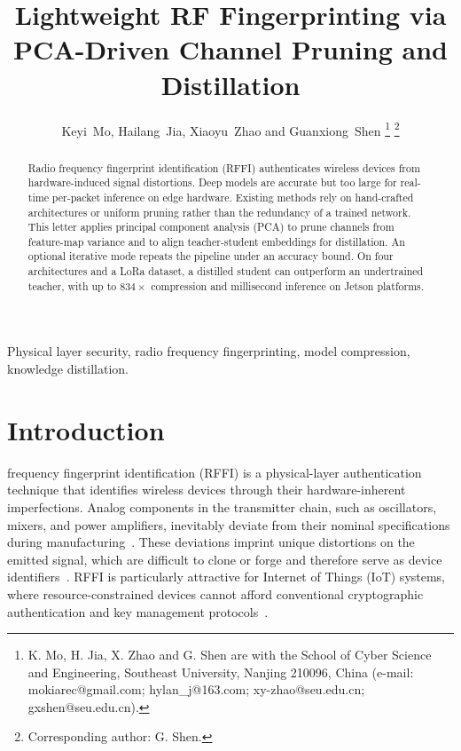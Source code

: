 \documentclass[journal,comsoc]{IEEEtran}
\begin{document}
\title{Lightweight RF Fingerprinting via PCA-Driven Channel Pruning and Distillation}

\author{Keyi~Mo, Hailang~Jia, Xiaoyu~Zhao and Guanxiong~Shen%
\thanks{K. Mo, H. Jia, X. Zhao and G. Shen are with the School of Cyber Science and Engineering, Southeast University, Nanjing 210096, China (e-mail: mokiarec@gmail.com; hylan\_j@163.com; xy-zhao@seu.edu.cn; gxshen@seu.edu.cn).}%
\thanks{Corresponding author: G. Shen.}%
}

\maketitle


\begin{abstract}
Radio frequency fingerprint identification (RFFI) authenticates wireless devices from hardware-induced signal distortions.
Deep models are accurate but too large for real-time per-packet inference on edge hardware.
Existing methods rely on hand-crafted architectures or uniform pruning rather than the redundancy of a trained network.
This letter applies principal component analysis (PCA) to prune channels from feature-map variance and to align teacher-student embeddings for distillation.
An optional iterative mode repeats the pipeline under an accuracy bound.
On four architectures and a LoRa dataset, a distilled student can outperform an undertrained teacher, with up to $834\times$ compression and millisecond inference on Jetson platforms.
\end{abstract}


\begin{IEEEkeywords}
Physical layer security, radio frequency fingerprinting, model compression, knowledge distillation.
\end{IEEEkeywords}


\section{Introduction}
\label{sec:intro}

 frequency fingerprint identification (RFFI) is a physical-layer authentication technique that identifies wireless devices through their hardware-inherent imperfections.
Analog components in the transmitter chain, such as oscillators, mixers, and power amplifiers, inevitably deviate from their nominal specifications during manufacturing~\cite{polak2011identifying,zhang2021radio}.
These deviations imprint unique distortions on the emitted signal, which are difficult to clone or forge and therefore serve as device identifiers~\cite{peng2019design,zhang2025physical}.
RFFI is particularly attractive for Internet of Things (IoT) systems, where resource-constrained devices cannot afford conventional cryptographic authentication and key management protocols~\cite{zhang2025physical}.
\end{document}
